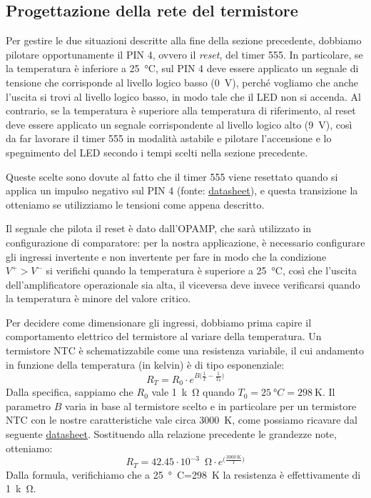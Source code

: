 \documentclass{report}
\begin{document}
\subsection{Progettazione della rete del termistore}\label{rete_termistore}
Per gestire le due situazioni descritte alla fine della sezione precedente, dobbiamo pilotare opportunamente il PIN 4, ovvero il \textit{reset}, del timer 555. In particolare, se la temperatura è inferiore a \SI{25}{\degree}C, sul PIN 4 deve essere applicato un segnale di tensione che corrisponde al livello logico basso (\SI{0}{\volt}), perché vogliamo che anche l'uscita si trovi al livello logico basso,  in modo tale che il LED non si accenda. Al contrario, se la temperatura è superiore alla temperatura di riferimento, al reset deve essere applicato un segnale corrispondente al livello logico alto (\SI{9}{\volt}), così da far lavorare il timer 555 in modalità astabile e pilotare l'accensione e lo spegnimento del LED secondo i tempi scelti nella sezione precedente. \par
\noindent Queste scelte sono dovute al fatto che il timer 555 viene resettato quando si applica un impulso negativo sul PIN 4 (fonte: \textcolor{blue}{\underline{\href{https://www.ti.com/lit/ds/symlink/lm555.pdf?ts=1667144089940&ref_url=https\%253A\%252F\%252Fwww.ti.com\%252Fproduct\%252FLM555}{datasheet}}}), e questa transizione la otteniamo se utilizziamo le tensioni come appena descritto. \par
Il segnale che pilota il reset è dato dall'OPAMP, che sarà utilizzato in configurazione di comparatore: per la nostra applicazione, è necessario configurare gli ingressi invertente e non invertente per fare in modo che la condizione $V^+>V^-$ si verifichi quando la temperatura è superiore a \SI{25}{\degree}C, così che l'uscita dell'amplificatore operazionale sia alta, il viceversa deve invece verificarsi quando la temperatura è minore del valore critico. \par
Per decidere come dimensionare gli ingressi, dobbiamo prima capire il comportamento elettrico del termistore al variare della temperatura. Un termistore NTC è schematizzabile come una resistenza variabile, il cui andamento in funzione della temperatura (in kelvin) è di tipo esponenziale:
$$ R_T = R_0\cdot e^{B\bigl(\frac{1}{T}-\frac{1}{T_0}\bigr)}$$
Dalla specifica, sappiamo che $R_0$ vale \SI{1}{k\ohm} quando $T_0 = \SI{25}{\degree C}=\SI{298}{\kelvin}$. Il parametro $B$ varia in base al termistore scelto e in particolare per un termistore NTC con le nostre caratteristiche vale circa \SI{3000}{\kelvin}, come possiamo ricavare dal seguente \textcolor{blue}{\underline{\href{https://www.mouser.it/datasheet/2/240/Littelfuse_Leaded_Thermistors_Glass_Encapsulated_T-1315924.pdf}{datasheet}}}. Sostituendo alla relazione precedente le grandezze note, otteniamo:
$$R_T = 42.45\cdot 10^{-3}\;\SI{}{\ohm}\cdot e^{\bigl(\frac{\SI{3000}{\kelvin}}{T}\bigr)} $$
Dalla formula, verifichiamo che a \SI{25}{\degree C}=\SI{298}{\kelvin} la resistenza è effettivamente di \SI{1}{k\ohm}.
\end{document}
